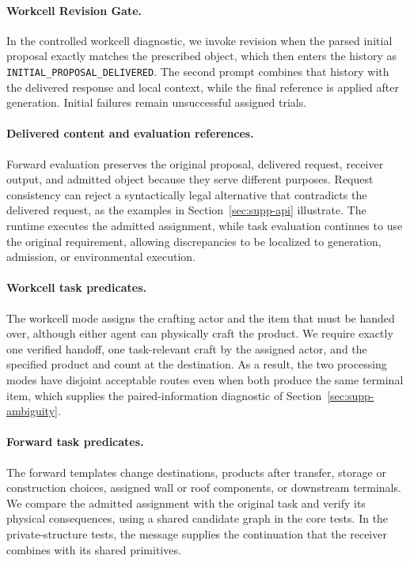 \documentclass[sigconf,nonacm,balance=false]{aamas}
\begin{document}
\paragraph{Workcell Revision Gate.}
In the controlled workcell diagnostic, we invoke revision when the parsed initial proposal exactly matches the prescribed object, which then enters the history as \texttt{INITIAL\_PROPOSAL\_DELIVERED}. The second prompt combines that history with the delivered response and local context, while the final reference is applied after generation. Initial failures remain unsuccessful assigned trials.

\paragraph{Delivered content and evaluation references.}
Forward evaluation preserves the original proposal, delivered request, receiver output, and admitted object because they serve different purposes. Request consistency can reject a syntactically legal alternative that contradicts the delivered request, as the examples in Section~\ref{sec:supp-api} illustrate. The runtime executes the admitted assignment, while task evaluation continues to use the original requirement, allowing discrepancies to be localized to generation, admission, or environmental execution.

\paragraph{Workcell task predicates.}
The workcell mode assigns the crafting actor and the item that must be handed over, although either agent can physically craft the product. We require exactly one verified handoff, one task-relevant craft by the assigned actor, and the specified product and count at the destination. As a result, the two processing modes have disjoint acceptable routes even when both produce the same terminal item, which supplies the paired-information diagnostic of Section~\ref{sec:supp-ambiguity}.

\paragraph{Forward task predicates.}
The forward templates change destinations, products after transfer, storage or construction choices, assigned wall or roof components, or downstream terminals. We compare the admitted assignment with the original task and verify its physical consequences, using a shared candidate graph in the core tests. In the private-structure tests, the message supplies the continuation that the receiver combines with its shared primitives.
\end{document}
